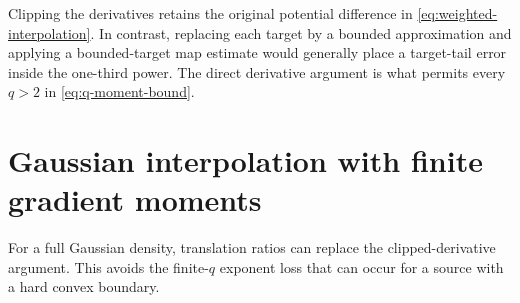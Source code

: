 \documentclass[11pt]{article}
\numberwithin{equation}{section}
\theoremstyle{remark}
\begin{document}
Clipping the derivatives retains the original potential difference in \eqref{eq:weighted-interpolation}. In contrast, replacing each target by a bounded approximation and applying a bounded-target map estimate would generally place a target-tail error inside the one-third power. The direct derivative argument is what permits every $q>2$ in \eqref{eq:q-moment-bound}.

\section{Gaussian interpolation with finite gradient moments}\label{sec:gaussian-interpolation}
For a full Gaussian density, translation ratios can replace the clipped-derivative argument. This avoids the finite-$q$ exponent loss that can occur for a source with a hard convex boundary.
\end{document}
